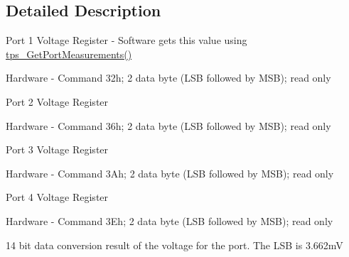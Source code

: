 \subsection{Detailed Description}
Port 1 Voltage Register -\/ Software gets this value using \hyperlink{_t_p_s23861_8c_aea33e295bb735809ad2edf78ed8b2543}{tps\-\_\-\-Get\-Port\-Measurements()} \par
 Hardware -\/ Command 32h; 2 data byte (L\-S\-B followed by M\-S\-B); read only \par
 Port 2 Voltage Register \par
 Hardware -\/ Command 36h; 2 data byte (L\-S\-B followed by M\-S\-B); read only \par
 Port 3 Voltage Register \par
 Hardware -\/ Command 3\-Ah; 2 data byte (L\-S\-B followed by M\-S\-B); read only \par
 Port 4 Voltage Register \par
 Hardware -\/ Command 3\-Eh; 2 data byte (L\-S\-B followed by M\-S\-B); read only \par
\par
 14 bit data conversion result of the voltage for the port. The L\-S\-B is 3.\-662m\-V 


